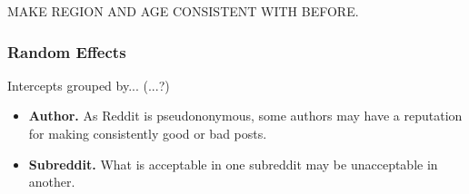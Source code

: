 MAKE REGION AND AGE CONSISTENT WITH BEFORE.

\subsubsection{Random Effects}

Intercepts grouped by... (...?)
\begin{itemize}
\item{\textbf{Author.} As Reddit is pseudononymous, some authors may have a reputation for making consistently good or bad posts.}
\item{\textbf{Subreddit.} What is acceptable in one subreddit may be unacceptable in another.}
\end{itemize}
